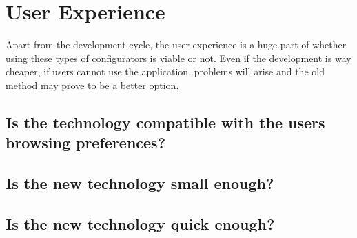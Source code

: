 \section{User Experience}
Apart from the development cycle, the user experience is a huge part of whether using these types of configurators is viable or not. Even if the development is way cheaper, if users cannot use the application, problems will arise and the old method may prove to be a better option.

\subsection{Is the technology compatible with the users browsing preferences?}

\subsection{Is the new technology small enough?}

\subsection{Is the new technology quick enough?}

